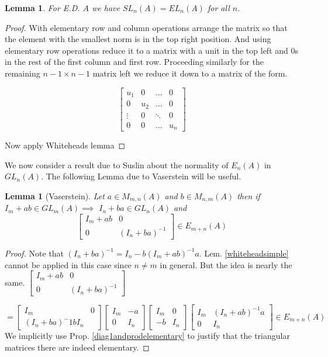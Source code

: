 \documentclass[12pt]{article}
\numberwithin{equation}{section}
\newcounter{dummy} \numberwithin{dummy}{section}
\newtheorem{lemma}[dummy]{Lemma}
\begin{document}
	
	\begin{lemma}
		For E.D. $A$ we have $SL_n(A)=EL_n(A)$ for all $n.$
	\end{lemma}
	\begin{proof}
		With elementary row and column operations arrange the matrix so that the element with the smallest norm is in the top right position. And using elementary row operations reduce it to a matrix with a unit in the top left and 0s in the rest of the first column and first row. Proceeding similarly for the remaining $n-1 \times n-1 $ matrix left we reduce it down to a matrix of the form.
		
		\[ \begin{bmatrix}
			u_1 & 0 & \dots & 0 \\
			0 & u_2 & \dots & 0 \\
			\vdots & 0 & \ddots & 0\\
			0 & 0 & \dots & u_n 
		\end{bmatrix} \]
		
		Now apply Whiteheads lemma 
	\end{proof}
	We now consider a result due to Suslin about the normality of $E_n(A) $ in $GL_n(A)$. The following Lemma due to Vaserstein will be useful.
	\begin{lemma}[Vaserstein]
		Let $a \in M_{m,n} (A)$ and $b \in M_{n,m}(A)$ then if $I_m+ab \in GL_m(A)	\implies $ $I_n+ba \in GL_n(A)$ and \[ \begin{bmatrix}
			I_m+ab & 0 \\ 0 & (I_n+ba)^{-1}
		\end{bmatrix} \in E_{m+n} (A)\] 
	\end{lemma}
	\begin{proof}
		Note that $(I_n+ba)^{-1}=I_n-b(I_m+ab)^{-1}a$. Lem. \ref{whiteheadsimple} cannot be applied in this case since $n\neq m$ in general. But the idea is nearly the same. 
		\( \begin{bmatrix}
			I_m+ab & 0 \\ 0 & (I_n+ba)^{-1}
		\end{bmatrix} 
		\)
		
		
		\(=\begin{bmatrix}
		I_m & 0 \\
		(I_n+ba)^-1b I_n
		\end{bmatrix}\begin{bmatrix}
		I_m & -a\\
		0 & I_n
		\end{bmatrix} \begin{bmatrix}
		I_m & 0\\
		-b & I_n
		\end{bmatrix} \begin{bmatrix}
		I_m & (I_n+ab)^{-1}a\\
		0 & I_n
		\end{bmatrix}\in E_{m+n} (A)\) 
		We implicitly use Prop. \ref{diag1andprodelementary} to justify that the triangular matrices there are indeed elementary.
	\end{proof}
	
\end{document}
